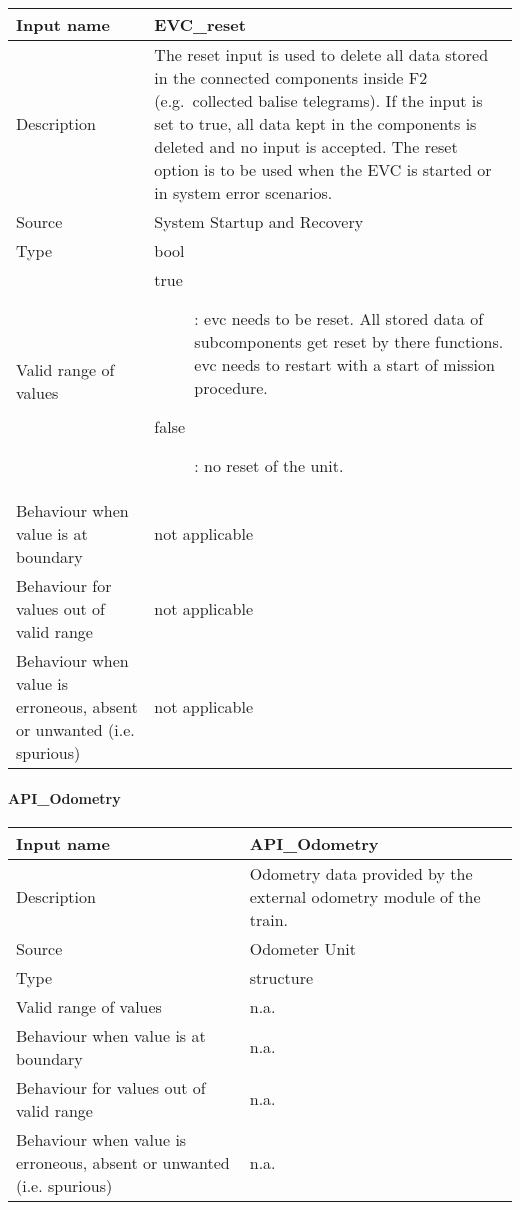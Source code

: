 \begin{longtable}{p{}p{}}
\toprule
Input name				& EVC\_reset \\
\midrule
Description				&  The reset input is used to delete all data stored in the connected components inside F2 (e.g.~collected balise telegrams). If the input is set to true, all data kept in the components is deleted and no input is accepted. The reset option is to be used when the EVC is started or in system error scenarios. \\
\midrule
Source					& System Startup and Recovery\\ 
\midrule
Type					& bool \\
\midrule
Valid range of values	&
\begin{description}
\item [true]: evc needs to be reset. All stored data of subcomponents get reset by there functions. evc needs to restart with a start of mission procedure.
\item [false]: no reset of the unit.
\end{description}
\\
\midrule
Behaviour when value is at boundary	& not applicable \\
\midrule
Behaviour for values out of valid range	& not applicable \\
\midrule
Behaviour when value is erroneous, absent or unwanted (i.e. spurious) &not applicable \\
\bottomrule
\end{longtable}

\paragraph{API\_Odometry}

\begin{longtable}{p{}p{}}
\toprule
Input name				& API\_Odometry \\
\midrule
Description				& Odometry data provided by the external odometry module of the train. \\
\midrule
Source					& Odometer Unit\\ 
\midrule
Type					& structure \\
\midrule
Valid range of values	& n.a. \\
\midrule
Behaviour when value is at boundary	& n.a. \\
\midrule
Behaviour for values out of valid range	& n.a. \\
\midrule
Behaviour when value is erroneous, absent or unwanted (i.e. spurious) &n.a. \\
\bottomrule
\end{longtable}

